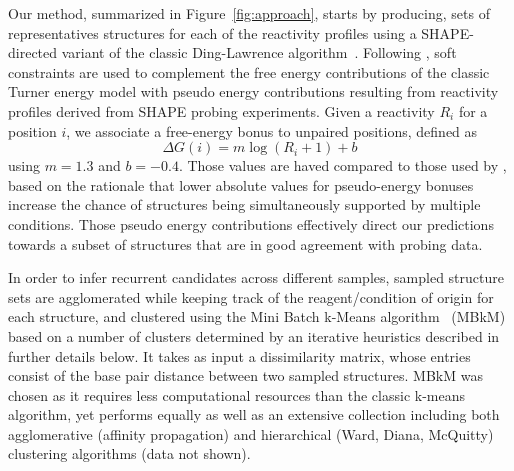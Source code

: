 \documentclass[a4,center,fleqn]{NAR}
\newcommand{\CL}{MBkM\xspace}
\begin{document}
Our method, summarized in Figure~\ref{fig:approach}, starts by producing, sets of representatives structures for each of the reactivity profiles using a SHAPE-directed variant of the classic Ding-Lawrence algorithm~\citep{Ding2003}. Following \citet{Deigan2009}, soft constraints are used to complement the free energy contributions of the classic Turner energy model with pseudo energy contributions resulting from reactivity profiles derived from SHAPE probing experiments.  Given a reactivity $R_i$ for a position $i$, we associate a free-energy bonus to unpaired positions, defined as
$$\Delta G(i) = m \log(R_i +1 )+b$$ 
using $m=1.3$ and  $b=-0.4$. Those values are haved compared to those used by \citet{Deigan2009}, based on the rationale that lower absolute values for pseudo-energy bonuses increase the chance of structures being simultaneously supported by multiple conditions. Those pseudo energy contributions effectively direct our predictions towards a subset of structures that are in good agreement with probing data. 

In order to infer recurrent candidates across different samples, sampled structure sets are agglomerated while keeping track of the reagent/condition of origin for each structure, and clustered using the Mini Batch k-Means algorithm~\citep{Sculley2010} (\CL{}) based on a number of clusters determined by an iterative heuristics described in further details below. 
It takes as input a dissimilarity matrix, whose entries consist of the base pair distance between two sampled structures.
\CL{} was chosen as it requires less computational resources than the classic k-means algorithm, yet performs equally as well as an extensive collection including  both agglomerative (affinity propagation) and hierarchical (Ward, Diana, McQuitty) clustering algorithms (data not shown). 
\end{document}
